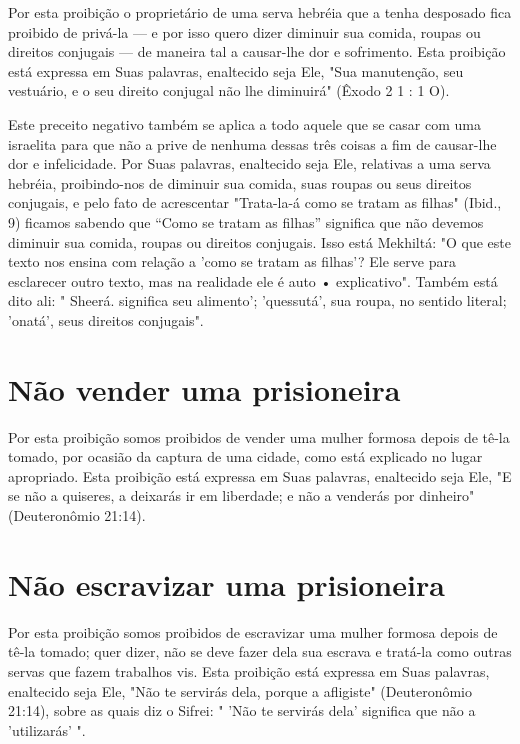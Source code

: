 Por esta proibição o proprietário de uma serva hebréia que a tenha
desposado fica proibido de privá-la --- e por isso quero dizer diminuir
sua co­mida, roupas ou direitos conjugais --- de maneira tal a
causar-lhe dor e sofri­mento. Esta proibição está expressa em Suas
palavras, enaltecido seja Ele, "Sua manutenção, seu vestuário, e o seu
direito conjugal não lhe diminuirá" (Êxodo 2 1 : 1 O).

Este preceito negativo também se aplica a todo aquele que se casar com
uma israelita para que não a prive de nenhuma dessas três coisas a fim
de causar-lhe dor e infelicidade. Por Suas palavras, enaltecido seja Ele,
relativas a uma serva hebréia, proibindo-nos de diminuir sua comida,
suas roupas ou seus direitos conjugais, e pelo fato de acrescentar
"Trata-la-á como se tratam as fi­lhas" (Ibid., 9) ficamos sabendo que
``Como se tratam as filhas'' significa que não devemos diminuir sua
comida, roupas ou direitos conjugais. Isso está
Mekhiltá: "O que este
texto nos ensina com relação a 'como se tra­tam as filhas'? Ele serve
para esclarecer outro texto, mas na realidade ele é auto • explicativo".
Também está dito ali: " Sheerá. significa seu
alimento'; 'quessu­tá', sua roupa, no sentido literal; 'onatá', seus
direitos conjugais".

\section{Não vender uma prisioneira}

Por esta proibição somos proibidos de vender uma mulher formosa depois
de tê-la tomado, por ocasião da captura de uma cidade, como está
expli­cado no lugar apropriado. Esta proibição está expressa em Suas
palavras, enal­tecido seja Ele, "E se não a quiseres, a deixarás ir em
liberdade; e não a vende­rás por dinheiro" (Deuteronômio 21:14).


\section{Não escravizar uma prisioneira}


Por esta proibição somos proibidos de escravizar uma mulher for­mosa
depois de tê-la tomado; quer dizer, não se deve fazer dela sua escrava e
tratá-la como outras servas que fazem trabalhos vis. Esta proibição está
ex­pressa em Suas palavras, enaltecido seja Ele, "Não te servirás dela,
porque a afligiste" (Deuteronômio 21:14), sobre as quais diz o Sifrei: "
'Não te servirás dela' significa que não a 'utilizarás' ".

